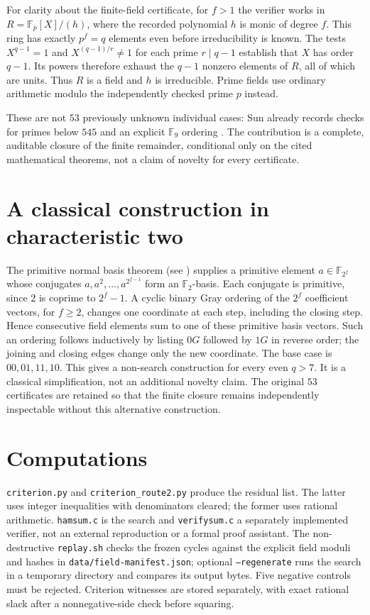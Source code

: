 \documentclass[11pt]{amsart}
\begin{document}
For clarity about the finite-field certificate, for $f>1$ the verifier works
in $R=\mathbb F_p[X]/(h)$, where the recorded polynomial $h$ is monic of
degree $f$. This ring has exactly $p^f=q$ elements even before irreducibility
is known. The tests $X^{q-1}=1$ and $X^{(q-1)/r}\ne1$ for each prime
$r\mid q-1$ establish that $X$ has order $q-1$. Its powers therefore exhaust
the $q-1$ nonzero elements of $R$, all of which are units. Thus $R$ is a field
and $h$ is irreducible. Prime fields use ordinary arithmetic modulo the
independently checked prime $p$ instead.

These are not $53$ previously unknown individual cases: Sun already records
checks for primes below $545$ and an explicit $\mathbb F_9$ ordering
\cite[Remark 3.5(a)]{Sun}. The contribution is a complete, auditable closure
of the finite remainder, conditional only on the cited mathematical theorems,
not a claim of novelty for every certificate.

\section{A classical construction in characteristic two}
The primitive normal basis theorem (see \cite[Theorem 1.2]{CH}) supplies a
primitive element $a\in\mathbb F_{2^f}$ whose conjugates
$a,a^2,\ldots,a^{2^{f-1}}$ form an $\mathbb F_2$-basis. Each conjugate is
primitive, since $2$ is coprime to $2^f-1$. A cyclic binary Gray ordering of
the $2^f$ coefficient vectors, for $f\ge2$, changes one coordinate at each
step, including the closing step. Hence consecutive field elements sum to
one of these primitive basis vectors. Such an ordering follows inductively
by listing $0G$ followed by $1G$ in reverse order; the joining and closing
edges change only the new coordinate. The base case is
$00,01,11,10$. This gives a non-search construction for every even $q>7$.
It is a classical simplification, not an additional novelty claim. The
original $53$ certificates are retained so that the finite closure remains
independently inspectable without this alternative construction.

\appendix
\section{Computations}
\texttt{criterion.py} and \texttt{criterion\_route2.py} produce the residual list.
The latter uses integer inequalities with denominators cleared; the former
uses rational arithmetic. \texttt{hamsum.c} is the search and
\texttt{verifysum.c} a separately implemented verifier, not an external
reproduction or a formal proof assistant. The non-destructive
\texttt{replay.sh} checks the frozen cycles against the explicit field
moduli and hashes in \texttt{data/field-manifest.json}; optional
\texttt{--regenerate} runs the search in a temporary directory and compares
its output bytes. Five negative controls must be rejected. Criterion
witnesses are stored separately, with exact rational slack after a
nonnegative-side check before squaring.
\end{document}
